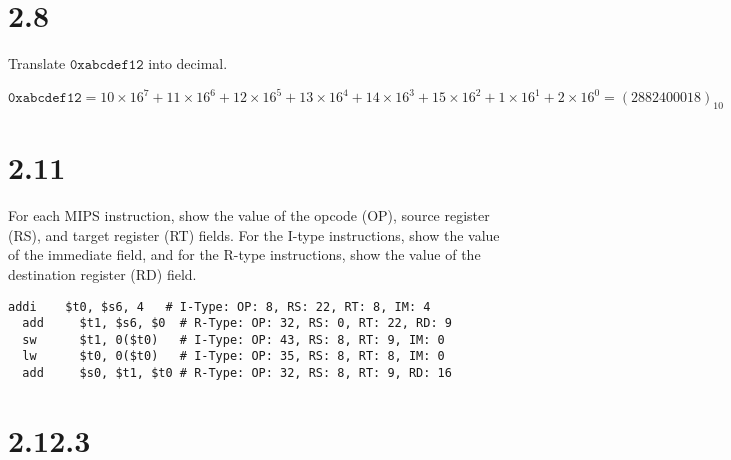 \documentclass[paper=a4, fontsize=11pt]{scrartcl} %
\begin{document}
\maketitle %

\section{2.8}

\begin{fancyquotes}
  Translate $\mathtt{0xabcdef12}$ into decimal.
\end{fancyquotes}

$$\mathtt{0xabcdef12} =
10\times 16^7 +
11\times 16^6 +
12\times 16^5 +
13\times 16^4 +
14\times 16^3 +
15\times 16^2 +
1\times 16^1 +
2\times 16^0
= {(2882400018)}_{10}$$


\section{2.11}

\begin{fancyquotes}
  For each MIPS instruction, show the value of the opcode (OP), source
  register (RS), and target register (RT) fields. For the I-type
  instructions, show the value of the immediate field, and for the
  R-type instructions, show the value of the destination register (RD)
  field.
\end{fancyquotes}

\begin{lstlisting}[language={[mips]Assembler}]
  addi    $t0, $s6, 4	# I-Type: OP: 8, RS: 22, RT: 8, IM: 4
  add     $t1, $s6, $0	# R-Type: OP: 32, RS: 0, RT: 22, RD: 9
  sw      $t1, 0($t0)	# I-Type: OP: 43, RS: 8, RT: 9, IM: 0
  lw      $t0, 0($t0)	# I-Type: OP: 35, RS: 8, RT: 8, IM: 0
  add     $s0, $t1, $t0	# R-Type: OP: 32, RS: 8, RT: 9, RD: 16
\end{lstlisting}


\section{2.12.3}
\end{document}
